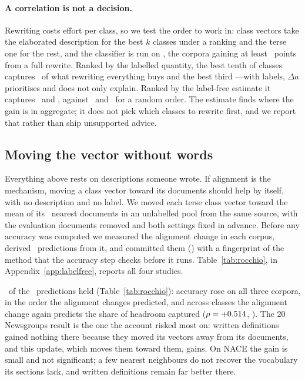 \documentclass[11pt]{article}
\begin{document}
\paragraph{A correlation is not a decision.}
Rewriting costs effort per class, so we test the order to work in: class
vectors take the elaborated description for the best $k$ classes under a
ranking and the terse one for the rest, and the classifier is run on
\PriorityCorpora, the corpora gaining at least \PriorityMinGain~points from a
full rewrite. Ranked by the labelled quantity, the best tenth of classes
captures \LabelledTenth\ of what rewriting everything buys and the best third
\LabelledThird---with labels, $\Delta a$ prioritises and does not only explain.
Ranked by the label-free estimate it captures \EstimateTenth\ and
\EstimateThird, against \RandomTenth\ and \RandomThird\ for a random order.
The estimate finds where the gain is in aggregate; it does not pick which
classes to rewrite first, and we report that rather than ship unsupported
advice.

\subsection{Moving the vector without words}
\label{sec:rocchio}

Everything above rests on descriptions someone wrote. If alignment is the
mechanism, moving a class vector toward its documents should help by itself,
with no description and no label. We moved each terse class vector toward the
mean of its \RocchioK\ nearest documents in an unlabelled pool from the same
source, with the evaluation documents removed and both settings fixed in
advance. Before any accuracy was computed we measured the alignment change in
each corpus, derived \RocchioPredictions\ predictions from it, and committed them
(\RocchioRegistered) with a fingerprint of the method that the accuracy step
checks before it runs. Table~\ref{tab:rocchio}, in
Appendix~\ref{app:labelfree}, reports all four studies.

\RocchioHeld\ of the \RocchioPredictions\ predictions held
(Table~\ref{tab:rocchio}): accuracy rose on all three corpora, in the order the
alignment changes predicted, and across classes the alignment change
again predicts the share of headroom captured ($\rho = +0.514$,
\RocchioRhoPStat). The 20 Newsgroups result is the one the account risked most
on: written definitions gained nothing there because they moved its vectors
away from its documents, and this update, which moves them toward them, gains.
On NACE the gain is small and not significant; a few nearest neighbours do not
recover the vocabulary its sections lack, and written definitions remain far
better there.
\end{document}
